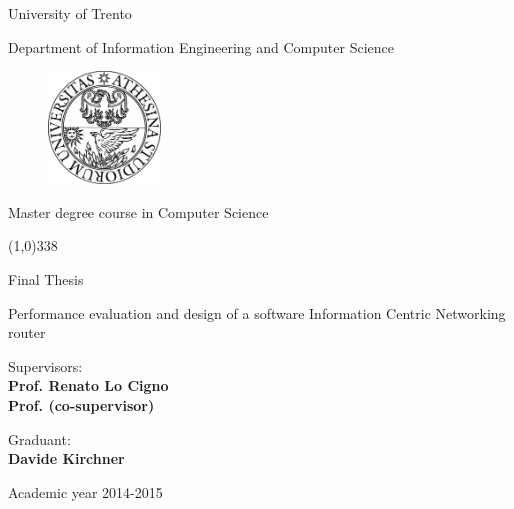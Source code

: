 \documentclass[12pt,a4paper,twoside]{book}
\begin{document}
\begin{titlepage}
  \begin{center}
    \begin{Large}University of Trento\\\end{Large}
    Department of Information Engineering and Computer Science
    \vspace{10pt}
    \begin{figure}[h!]
      \begin{center}
        \includegraphics[width=3cm]{img/unitn_logo.pdf}
      \end{center}
    \end{figure}

    Master degree course in Computer Science

    \vspace{10pt}
    \line(1,0){338}
    \vspace{10pt}

    Final Thesis\\
  \end{center}

  \vspace{3cm}

  \begin{center}
    \begin{Large}
      Performance evaluation and design of a software Information Centric
      Networking router\\\end{Large}
    \vspace{3cm}
  \end{center}

  \noindent
  \begin{minipage}[t]{.7\linewidth}
    Supervisors:\\ 
    \textbf{Prof. Renato Lo Cigno}\\
    \textbf{Prof. (co-supervisor)}
  \end{minipage}%
  \begin{minipage}[t]{.25\linewidth}
    Graduant:\\
    \textbf{Davide Kirchner}
  \end{minipage}

  \vspace{2cm}
  \begin{center}
    Academic year 2014-2015
  \end{center}
\end{titlepage}
\end{document}
